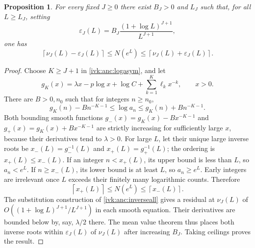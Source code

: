 \documentclass[11pt,letterpaper]{article}
\newtheorem{proposition}[theorem]{Proposition}
\theoremstyle{remark}\newtheorem{remark}[theorem]{Remark}
\newcommand{\eps}{\varepsilon}
\newcommand{\ceil}[1]{\left\lceil#1\right\rceil}
\begin{document}
\begin{proposition}\label{ivk:anc:prop:ceil}
For every fixed $J\ge0$ there exist $B_J>0$ and $L_J$ such that,
for all $L\ge L_J$, setting
\[
 \eps_J(L)=B_J\frac{(1+\log L)^{J+1}}{L^{J+1}},
\]
one has
\begin{equation}\label{ivk:anc:ceilall}
 \ceil{\nu_J(L)-\eps_J(L)}\le N(e^L)
                    \le\ceil{\nu_J(L)+\eps_J(L)}.
\end{equation}
\end{proposition}
\begin{proof}
Choose $K\ge J+1$ in \eqref{ivk:anc:logasym}, and let
\[
 g_K(x)=\lambda x-p\log x+\log C+
                   \sum_{k=1}^K\ell_kx^{-k},\qquad x>0.
\]
There are $B>0,n_0$ such that for integers $n\ge n_0$,
\[
 g_K(n)-Bn^{-K-1}\le\log a_n
                  \le g_K(n)+Bn^{-K-1}.
\]
Both bounding smooth functions $g_-(x)=g_K(x)-Bx^{-K-1}$ and
$g_+(x)=g_K(x)+Bx^{-K-1}$ are strictly increasing for sufficiently
large $x$, because their derivatives tend to $\lambda>0$.
For large $L$, let their unique large inverse roots be
$x_-(L)=g_-^{-1}(L)$ and $x_+(L)=g_+^{-1}(L)$; the ordering is
$x_+(L)\le x_-(L)$. If an integer $n<x_+(L)$, its upper bound is
less than $L$, so $a_n<e^L$. If $n\ge x_-(L)$, its lower bound is
at least $L$, so $a_n\ge e^L$. Early integers are irrelevant
once $L$ exceeds their finitely many logarithmic counts. Therefore
\[
 \ceil{x_+(L)}\le N(e^L)\le\ceil{x_-(L)}.
\]
The substitution construction of \eqref{ivk:anc:inverseall} gives a
residual at $\nu_J(L)$ of
$O((1+\log L)^{J+1}/L^{J+1})$ in each smooth equation.
Their derivatives are bounded below by, say, $\lambda/2$ there.
The mean value theorem thus places both inverse roots within
$\eps_J(L)$ of $\nu_J(L)$ after increasing $B_J$. Taking ceilings
proves the result.
\end{proof}
\end{document}

